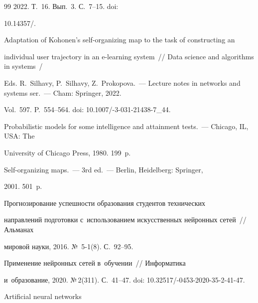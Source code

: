 {{\begin{thebibliography}{99}
2022. Т.~16. Вып.~3. С.~7--15. doi: 


10.14357\!/.




 Adaptation of Kohonen's self-organizing map to the task of constructing an 


individual user trajectory in an e-learning system~/\!\!/ Data science and algorithms in systems~/


Eds. R.~Silhavy, P.~Silhavy, Z.~Prokopova.~--- Lecture notes in networks and systems ser.~--- Cham: Springer, 2022. 


Vol.~597. P.~554--564. doi: 10.1007\!/-3-031-21438-7\_44.




 Probabilistic models for some intelligence and attainment tests.~--- Chicago, IL, USA: The 


University of Chicago Press, 1980. 199~p.




 Self-organizing maps.~--- 3rd ed.~--- Berlin, Heidelberg: Springer, 


2001. 501~p.













 Прогнозирование успешности образования студентов технических 


направлений подготовки с~использованием искусственных нейронных сетей~/\!\!/ Альманах 


мировой науки, 2016. №\, 5-1(8). С.~92--95. 




 Применение нейронных сетей в~обучении~/\!\!/ Информатика 


и~образование, 2020. №\,2(311). С.~41--47.  doi: 10.32517\!/-0453-2020-35-2-41-47.













 Artificial neural networks 



\end{thebibliography}}}
